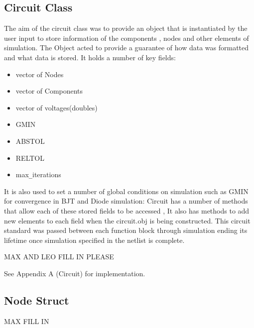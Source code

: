 \documentclass{article}
\begin{document}
\subsection{Circuit Class}
The aim of the circuit class was to provide an object that is instantiated by the user input to store information of the components , nodes and other elements of simulation. The Object acted to provide a guarantee of how data was formatted and what data is stored. It holds a number of key fields:
\medbreak
\noindent\begin{minipage}{.5\linewidth}
\begin{itemize}
    \item vector of Nodes
    \item vector of Components
    \item vector of voltages(doubles)
\end{itemize}
\end{minipage}%
\begin{minipage}{.5\linewidth}
\begin{itemize}\break
    \item GMIN
    \item ABSTOL
    \item RELTOL
    \item max\verb|_|iterations
\end{itemize}
\end{minipage}
\medbreak
It is also used to set a number of global conditions on simulation such as GMIN for convergence in BJT and Diode simulation:
\medbreak
Circuit has a number of methods that allow each of these stored fields to be accessed , It also has methods to add new elements to each field when the circuit.obj is being constructed. This circuit standard was passed between each function block through simulation ending its lifetime once simulation specified in the netlist is complete.

MAX AND LEO FILL IN PLEASE

\bigbreak
See Appendix A (Circuit) for implementation.
\subsection{Node Struct}
MAX FILL IN
\newpage
\end{document}
